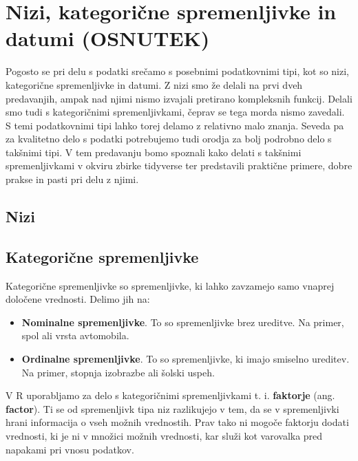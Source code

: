 \documentclass[
]{book}
\providecommand{\tightlist}{%
  \setlength{\itemsep}{0pt}\setlength{\parskip}{0pt}}
\begin{document}
\hypertarget{nizi-kategoriux10dne-spremenljivke-in-datumi-osnutek}{%
\chapter{Nizi, kategorične spremenljivke in datumi (OSNUTEK)}\label{nizi-kategoriux10dne-spremenljivke-in-datumi-osnutek}}

Pogosto se pri delu s podatki srečamo s posebnimi podatkovnimi tipi, kot so nizi, kategorične spremenljivke in datumi. Z nizi smo že delali na prvi dveh predavanjih, ampak nad njimi nismo izvajali pretirano kompleksnih funkcij. Delali smo tudi s kategoričnimi spremenljivkami, čeprav se tega morda nismo zavedali. S temi podatkovnimi tipi lahko torej delamo z relativno malo znanja. Seveda pa za kvalitetno delo s podatki potrebujemo tudi orodja za bolj podrobno delo s takšnimi tipi. V tem predavanju bomo spoznali kako delati s takšnimi spremenljivkami v okviru zbirke tidyverse ter predstavili praktične primere, dobre prakse in pasti pri delu z njimi.

\hypertarget{nizi}{%
\section{Nizi}\label{nizi}}

\hypertarget{kategoriux10dne-spremenljivke}{%
\section{Kategorične spremenljivke}\label{kategoriux10dne-spremenljivke}}

Kategorične spremenljivke so spremenljivke, ki lahko zavzamejo samo vnaprej določene vrednosti. Delimo jih na:

\begin{itemize}
\tightlist
\item
  \textbf{Nominalne spremenljivke}. To so spremenljivke brez ureditve. Na primer, spol ali vrsta avtomobila.
\item
  \textbf{Ordinalne spremenljivke}. To so spremenljivke, ki imajo smiselno ureditev. Na primer, stopnja izobrazbe ali šolski uspeh.
\end{itemize}

V R uporabljamo za delo s kategoričnimi spremenljivkami t. i. \textbf{faktorje} (ang. \textbf{factor}). Ti se od spremenljivk tipa niz razlikujejo v tem, da se v spremenljivki hrani informacija o vseh možnih vrednostih. Prav tako ni mogoče faktorju dodati vrednosti, ki je ni v množici možnih vrednosti, kar služi kot varovalka pred napakami pri vnosu podatkov.
\end{document}
